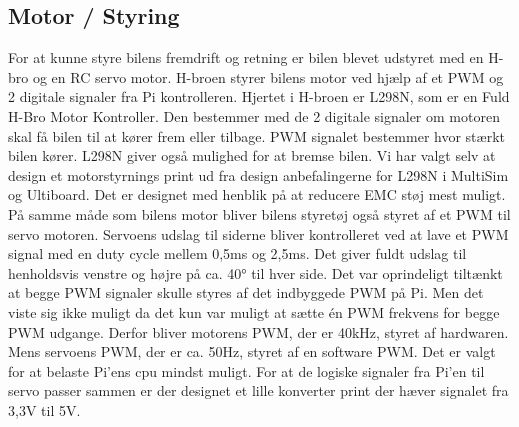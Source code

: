 \subsection{Motor / Styring}

For at kunne styre bilens fremdrift og retning er bilen blevet udstyret med en H-bro og en RC servo motor.
H-broen styrer bilens motor ved hjælp af et PWM og 2 digitale signaler fra Pi kontrolleren. 
Hjertet i H-broen er L298N\cite{lib:L298N_datablad}, som er en Fuld H-Bro Motor Kontroller. 
Den bestemmer med de 2 digitale signaler om motoren skal få bilen til at kører frem eller tilbage. 
PWM signalet bestemmer hvor stærkt bilen kører. 
L298N giver også mulighed for at bremse bilen.\newline 
Vi har valgt selv at design et motorstyrnings  print ud fra design anbefalingerne for L298N  i MultiSim og Ultiboard. 
Det er designet med henblik på at reducere EMC støj mest muligt.\newline
På samme måde som bilens motor bliver bilens styretøj også styret af et PWM til servo motoren. 
Servoens udslag til siderne bliver kontrolleret ved at lave et PWM signal med en duty cycle mellem 0,5ms og 2,5ms. 
Det giver fuldt udslag til henholdsvis venstre og højre på ca. 40\si{\degree} til hver side.
Det var oprindeligt tiltænkt at begge PWM signaler skulle styres af det indbyggede PWM på Pi. 
Men det viste sig ikke muligt da det kun var muligt at sætte én PWM frekvens for begge PWM udgange. 
Derfor bliver motorens PWM, der er 40kHz, styret af hardwaren. 
Mens servoens PWM, der er ca. 50Hz, styret af en software PWM. 
Det er valgt for at belaste Pi'ens cpu mindst muligt.
For at de logiske signaler fra Pi'en til servo passer sammen er der designet et lille konverter print der hæver signalet fra 3,3V til 5V.
